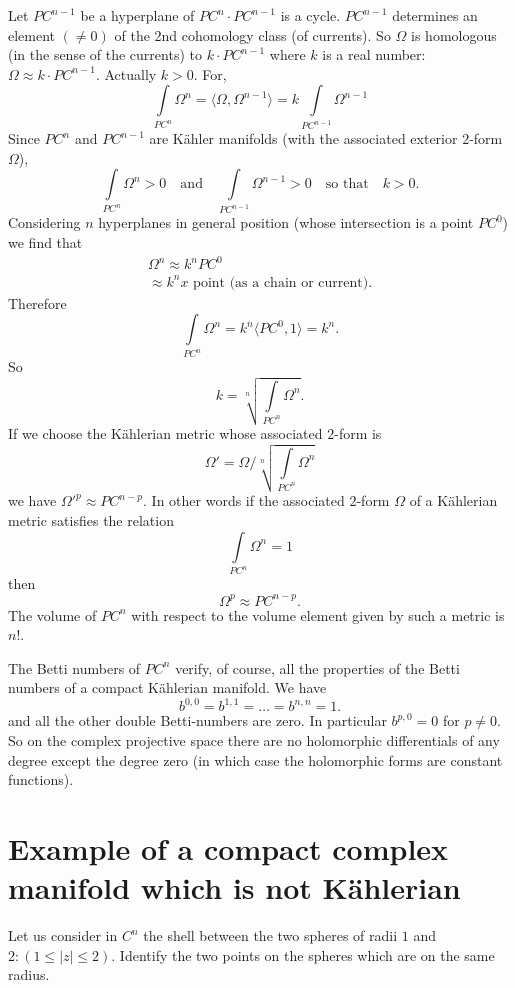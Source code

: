 Let $PC^{n-1}$ be a hyperplane of $PC^{n}\cdot PC^{n-1}$ is a
cycle. $PC^{n-1}$ determines an element $(\neq 0)$ of the $2$nd
cohomology class (of currents). So $\Omega$ is homologous (in the
sense of the currents) to $k\cdot PC^{n-1}$ where $k$ is a real
number: $\Omega\approx k\cdot PC^{n-1}$. Actually $k>0$. For,
$$
\int\limits_{PC^{n}}\Omega^{n}=\langle
\Omega,\Omega^{n-1}\rangle=k\int\limits_{PC^{n-1}}\Omega^{n-1} 
$$
Since $PC^{n}$ and $PC^{n-1}$ are K\"ahler manifolds (with the
associated exterior $2$-form $\Omega$),
$$
\int\limits_{PC^{n}}\Omega^{n}>0\quad\text{and}\quad
\int\limits_{PC^{n-1}}\Omega^{n-1}>0\quad\text{so that}\quad k>0.
$$\pageoriginale
Considering $n$ hyperplanes in general position (whose intersection is
a point $PC^{0}$) we find that
\begin{gather*}
\Omega^{n}\approx k^{n}PC^{0}\\
\approx k^{n}x\text{ \  point (as a chain or current).}
\end{gather*}
Therefore
$$
\int\limits_{PC^{n}}\Omega^{n}=k^{n}\langle PC^{0},1\rangle =k^{n}.
$$
So
$$
k=\sqrt[n]{\int\limits_{PC^{n}}\Omega^{n}}.
$$
If we choose the K\"ahlerian metric whose associated $2$-form is
$$
\Omega'=\Omega/\sqrt[n]{\int\limits_{PC^{n}}\Omega^{n}}
$$
we have ${\Omega'}^{p}\approx PC^{n-p}$. In other words if the
associated $2$-form $\Omega$ of a K\"ahlerian metric satisfies the
relation
$$
\int\limits_{PC^{n}}\Omega^{n}=1
$$
then
$$
\Omega^{p}\approx PC^{n-p}.
$$
The volume of $PC^{n}$ with respect to the volume element given by
such a metric is $n!$.

The Betti numbers of $PC^{n}$ verify, of course, all the properties of
the Betti numbers of a compact K\"ahlerian manifold. We have 
$$
b^{0,0}=b^{1,1}=\ldots=b^{n,n}=1.
$$\pageoriginale
and all the other double Betti-numbers are zero. In particular
$b^{p,0}=0$ for $p\neq 0$. So on the complex projective space there
are no holomorphic differentials of any degree except the degree zero
(in which case the holomorphic forms are constant functions).

\section*{Example of a compact complex manifold which is not
  K\"ahlerian}

Let us consider in $C^{n}$ the shell between the two spheres of radii
$1$ and $2:(1\leq |z|\leq 2)$. Identify the two points on the spheres
which are on the same radius.

